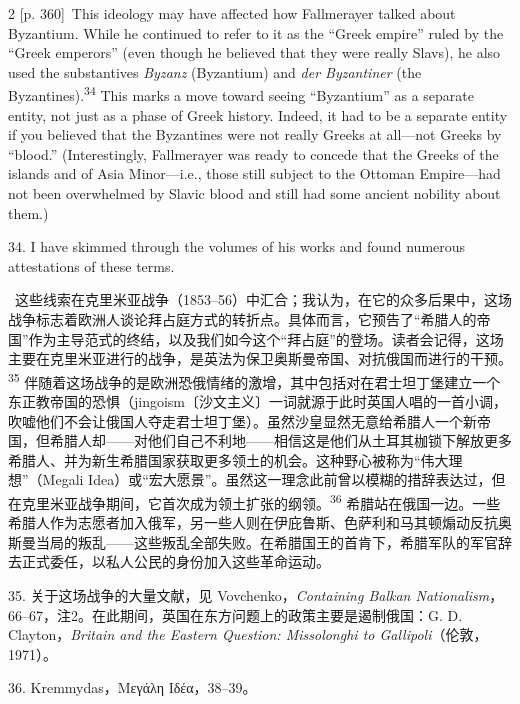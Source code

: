 \documentclass[10pt,a4paper]{article}
\begin{document}
\begin{paracol}{2}
\switchcolumn
{\scriptsize\color{gray}[p. 360]}\ This ideology may have affected how Fallmerayer talked about Byzantium. While he continued to refer to it as the “Greek empire” ruled by the “Greek emperors” (even though he believed that they were really Slavs), he also used the substantives \textit{Byzanz} (Byzantium) and \textit{der Byzantiner} (the Byzantines).\nobreak\textsuperscript{34} This marks a move toward seeing “Byzantium” as a separate entity, not just as a phase of Greek history. Indeed, it had to be a separate entity if you believed that the Byzantines were not really Greeks at all—not Greeks by “blood.” (Interestingly, Fallmerayer was ready to concede that the Greeks of the islands and of Asia Minor—i.e., those still subject to the Ottoman Empire—had not been overwhelmed by Slavic blood and still had some ancient nobility about them.)\par{\small 34. I have skimmed through the volumes of his works and found numerous attestations of these terms.\par}
\switchcolumn*
{\scriptsize\color{gray}[p. 360–361]}\ 这些线索在克里米亚战争（1853–56）中汇合；我认为，在它的众多后果中，这场战争标志着欧洲人谈论拜占庭方式的转折点。具体而言，它预告了“希腊人的帝国”作为主导范式的终结，以及我们如今这个“拜占庭”的登场。读者会记得，这场主要在克里米亚进行的战争，是英法为保卫奥斯曼帝国、对抗俄国而进行的干预。\nobreak\textsuperscript{35} 伴随着这场战争的是欧洲恐俄情绪的激增，其中包括对在君士坦丁堡建立一个东正教帝国的恐惧（jingoism〔沙文主义〕一词就源于此时英国人唱的一首小调，吹嘘他们不会让俄国人夺走君士坦丁堡）。虽然沙皇显然无意给希腊人一个新帝国，但希腊人却——对他们自己不利地——相信这是他们从土耳其枷锁下解放更多希腊人、并为新生希腊国家获取更多领土的机会。这种野心被称为“伟大理想”（Megali Idea）或“宏大愿景”。虽然这一理念此前曾以模糊的措辞表达过，但在克里米亚战争期间，它首次成为领土扩张的纲领。\nobreak\textsuperscript{36} 希腊站在俄国一边。一些希腊人作为志愿者加入俄军，另一些人则在伊庇鲁斯、色萨利和马其顿煽动反抗奥斯曼当局的叛乱——这些叛乱全部失败。在希腊国王的首肯下，希腊军队的军官辞去正式委任，以私人公民的身份加入这些革命运动。\par{\small 35. 关于这场战争的大量文献，见 Vovchenko，\textit{Containing Balkan Nationalism}，66–67，注2。在此期间，英国在东方问题上的政策主要是遏制俄国：G. D. Clayton，\textit{Britain and the Eastern Question: Missolonghi to Gallipoli}（伦敦，1971）。\par}{\small 36. Kremmydas，Μεγάλη Ιδέα，38–39。\par}
\switchcolumn

\end{paracol}
\end{document}

